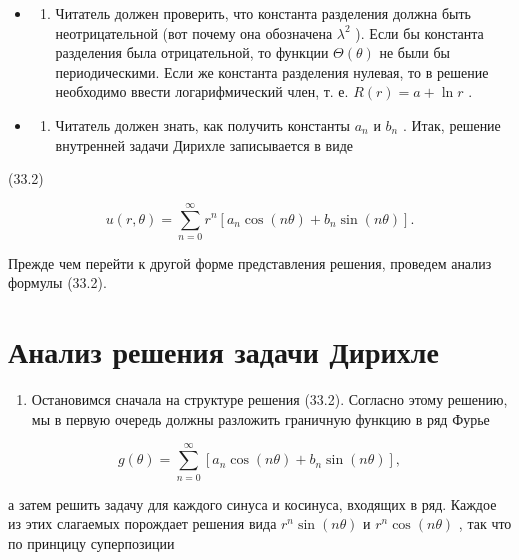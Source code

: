 \documentclass[
  ukrainian,
]{article}
\providecommand{\tightlist}{%
  \setlength{\itemsep}{0pt}\setlength{\parskip}{0pt}}
\begin{document}
\begin{itemize}
\tightlist
\item
  \begin{enumerate}
  \def\labelenumi{\arabic{enumi}.}
  \tightlist
  \item
    Читатель должен проверить, что константа разделения должна быть
    неотрицательной (вот почему она обозначена \(\lambda^2\) ). Если бы
    константа разделения была отрицательной, то функции
    \(\Theta(\theta)\) не были бы периодическими. Если же константа
    разделения нулевая, то в решение необходимо ввести логарифмический
    член, т. е. \(R(r) = a + \ln r\) .
  \end{enumerate}
\item
  \begin{enumerate}
  \def\labelenumi{\arabic{enumi}.}
  \setcounter{enumi}{1}
  \tightlist
  \item
    Читатель должен знать, как получить константы \(a_n\) и \(b_n\) .
    Итак, решение внутренней задачи Дирихле записывается в виде
  \end{enumerate}
\end{itemize}

(33.2)

\[
u(r, \theta) = \sum_{n=0}^{\infty} r^n \left[ a_n \cos(n\theta) + b_n \sin(n\theta) \right].
\]

Прежде чем перейти к другой форме представления решения, проведем анализ
формулы (33.2).

\section{Анализ решения задачи
Дирихле}\label{ux430ux43dux430ux43bux438ux437-ux440ux435ux448ux435ux43dux438ux44f-ux437ux430ux434ux430ux447ux438-ux434ux438ux440ux438ux445ux43bux435}

\begin{enumerate}
\def\labelenumi{\arabic{enumi}.}
\tightlist
\item
  Остановимся сначала на структуре решения (33.2). Согласно этому
  решению, мы в первую очередь должны разложить граничную функцию в ряд
  Фурье
\end{enumerate}

\[
g(\theta) = \sum_{n=0}^{\infty} [a_n \cos(n\theta) + b_n \sin(n\theta)],
\]

а затем решить задачу для каждого синуса и косинуса, входящих в ряд.
Каждое из этих слагаемых порождает решения вида \(r^n \sin{(n\theta)}\)
и \(r^n \cos{(n\theta)}\) , так что по принцицу суперпозиции
\end{document}
